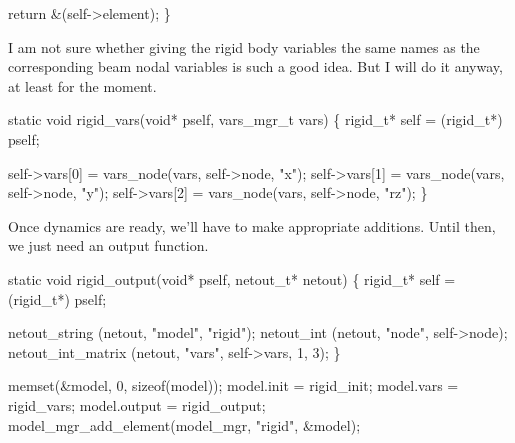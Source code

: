     return &(self->element);
\}

\nwendcode{}\nwdocspar

I am not sure whether giving the rigid body variables the same names
as the corresponding beam nodal variables is such a good idea.  But
I will do it anyway, at least for the moment.

\nwenddocs{}\plusendmoddef
static void rigid_vars(void* pself, vars_mgr_t vars)
\{
    rigid_t* self = (rigid_t*) pself;

    self->vars[0] = vars_node(vars, self->node, "x");
    self->vars[1] = vars_node(vars, self->node, "y");
    self->vars[2] = vars_node(vars, self->node, "rz");
\}

\nwendcode{}\nwdocspar

Once dynamics are ready, we'll have to make appropriate additions. %
Until then, we just need an output function.

\nwenddocs{}\plusendmoddef
static void rigid_output(void* pself, netout_t* netout)
\{
    rigid_t* self = (rigid_t*) pself;

    netout_string        (netout, "model",     "rigid");
    netout_int           (netout, "node",      self->node);
    netout_int_matrix    (netout, "vars",      self->vars, 1, 3);
\}

\nwendcode{}\nwdocspar

\nwenddocs{}\endmoddef
memset(&model, 0, sizeof(model));
model.init    = rigid_init;
model.vars    = rigid_vars;
model.output  = rigid_output;
model_mgr_add_element(model_mgr, "rigid", &model);

